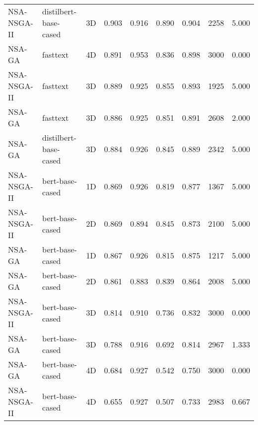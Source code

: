 \begin{table*}[h]
{\begin{tabular}{lllrrrrrr}
NSA-NSGA-II & distilbert-base-cased & 3D & 0.903 & 0.916 & 0.890 & 0.904 & 2258 & 5.000 \\
NSA-GA & fasttext & 4D & 0.891 & 0.953 & 0.836 & 0.898 & 3000 & 0.000 \\
NSA-NSGA-II & fasttext & 3D & 0.889 & 0.925 & 0.855 & 0.893 & 1925 & 5.000 \\
NSA-GA & fasttext & 3D & 0.886 & 0.925 & 0.851 & 0.891 & 2608 & 2.000 \\
NSA-GA & distilbert-base-cased & 3D & 0.884 & 0.926 & 0.845 & 0.889 & 2342 & 5.000 \\
NSA-NSGA-II & bert-base-cased & 1D & 0.869 & 0.926 & 0.819 & 0.877 & 1367 & 5.000 \\
NSA-NSGA-II & bert-base-cased & 2D & 0.869 & 0.894 & 0.845 & 0.873 & 2100 & 5.000 \\
NSA-GA & bert-base-cased & 1D & 0.867 & 0.926 & 0.815 & 0.875 & 1217 & 5.000 \\
NSA-GA & bert-base-cased & 2D & 0.861 & 0.883 & 0.839 & 0.864 & 2008 & 5.000 \\
NSA-NSGA-II & bert-base-cased & 3D & 0.814 & 0.910 & 0.736 & 0.832 & 3000 & 0.000 \\
NSA-GA & bert-base-cased & 3D & 0.788 & 0.916 & 0.692 & 0.814 & 2967 & 1.333 \\
NSA-GA & bert-base-cased & 4D & 0.684 & 0.927 & 0.542 & 0.750 & 3000 & 0.000 \\
NSA-NSGA-II & bert-base-cased & 4D & 0.655 & 0.927 & 0.507 & 0.733 & 2983 & 0.667 \\
\bottomrule
\end{tabular}
    }
\end{table*}
